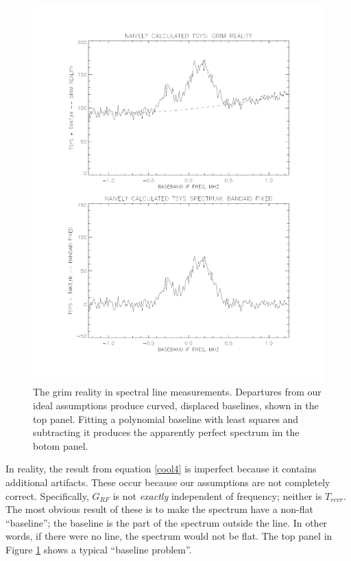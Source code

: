 \documentclass[preprint]{aastex}
\begin{document}
\begin{figure}[p!]
\centering
\includegraphics[width=5in]{bmp_cal1.pdf}

\caption{ The grim reality in spectral line measurements. Departures
from our ideal assumptions produce curved, displaced baselines, shown in
the top panel. Fitting a polynomial baseline with least squares and
subtracting it produces the apparently perfect spectrum im the botom
panel. \label{bmp_cal1}}

\end{figure}

	In reality, the result from equation \ref{cool4} is imperfect
because it contains additional artifacts. These occur because our
assumptions are not completely correct. Specifically, $G_{RF}$ is not
{\it exactly} independent of frequency; neither is $T_{rcvr}$. The most
obvious result of these is to make the spectrum have a non-flat
``baseline''; the baseline is the part of the spectrum outside the line.
In other words, if there were no line, the spectrum would not be flat.
The top panel in Figure \ref{bmp_cal1} shows a typical ``baseline
problem''. 
\end{document}
